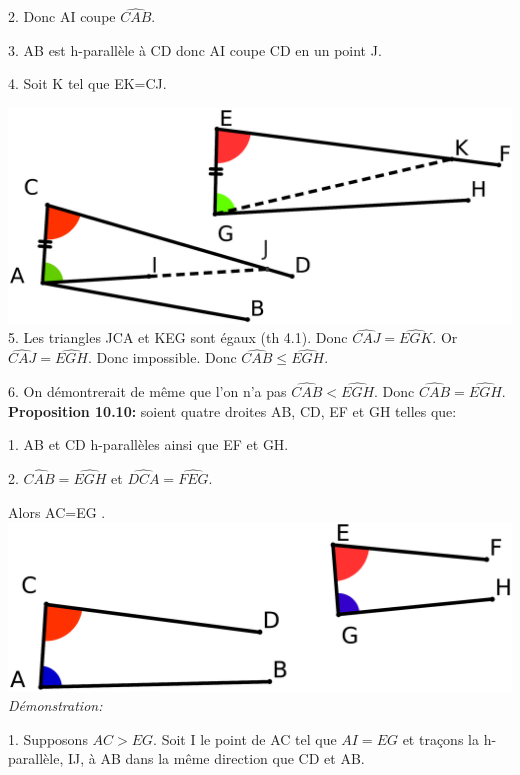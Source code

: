 \documentclass[a4paper, 12pt, twoside]{book}
\begin{document}
  2. Donc AI coupe  $\hat{CAB}$.\
  
  3. AB est h-parallèle à CD donc AI coupe CD en un point J. \
  
  4. Soit K tel que EK=CJ.\
  
  
  \includegraphics[scale=0.2]{figures/Lobat18.eps}\\
  
  
  5. Les triangles JCA et KEG sont égaux (th 4.1). Donc $\hat{CAJ}=\hat{EGK}$. Or $\hat{CAJ}=\hat{EGH}$. Donc impossible. Donc  $\hat{CAB}\leq\hat{EGH}$.\
  
  6. On démontrerait de même que l'on n'a pas $\hat{CAB}<\hat{EGH}$. Donc $\hat{CAB}=\hat{EGH}$.\\
  
  \textbf{Proposition 10.10:} soient quatre droites AB, CD, EF et GH telles que:\

1. AB et CD h-parallèles ainsi que EF et GH.\

2.  $\hat{CAB}=\hat{EGH}$ et   $\hat{DCA}=\hat{FEG}$.\

Alors AC=EG .\\
   
 
   
  \includegraphics[scale=0.2]{figures/Lobat19.eps}\\ 
         
        
   \textit{Démonstration:}\
   
   1. Supposons $AC>EG$. Soit I le point de AC tel que $AI=EG$ et traçons la h-parallèle, IJ, à AB dans la même direction que CD et AB.   
       
\end{document}
